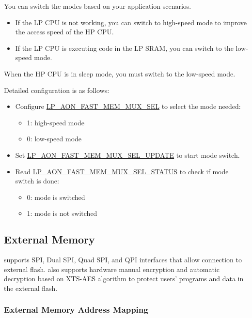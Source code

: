 \documentclass[main\_\_EN.tex]{subfiles}
\begin{document}
You can switch the modes based on your application scenarios.
\begin{itemize}
    \item If the LP CPU is not working, you can switch to high-speed mode to improve the access speed of the HP CPU.
    \item If the LP CPU is executing code in the LP SRAM, you can switch to the low-speed mode.
\end{itemize}

When the HP CPU is in sleep mode, you must switch to the low-speed mode.

Detailed configuration is as follows:
\begin{itemize}
    \item Configure \hyperref[fielddesc:LPAONFASTMEMMUXSEL]{LP\_AON\_FAST\_MEM\_MUX\_SEL} to select the mode needed:
    \begin{itemize}
        \item 1: high-speed mode
        \item 0: low-speed mode
    \end{itemize}
    \item Set \hyperref[fielddesc:LPAONFASTMEMMUXSELUPDATE]{LP\_AON\_FAST\_MEM\_MUX\_SEL\_UPDATE} to start mode switch.
    \item Read \hyperref[fielddesc:LPAONFASTMEMMUXSELSTATUS]{LP\_AON\_FAST\_MEM\_MUX\_SEL\_STATUS} to check if mode switch is done:
    \begin{itemize}
        \item 0: mode is switched
        \item 1: mode is not switched
    \end{itemize}
\end{itemize}

\subsection{External Memory} 
\label{para:sysmem-external-memory}

\chipname{} supports SPI, Dual SPI, Quad SPI, and QPI interfaces that allow connection to external flash. 
\chipname{} also supports hardware manual encryption and automatic decryption based on XTS-AES algorithm to protect users’ programs and data in the external flash.


\subsubsection{External Memory Address Mapping}
\end{document}
